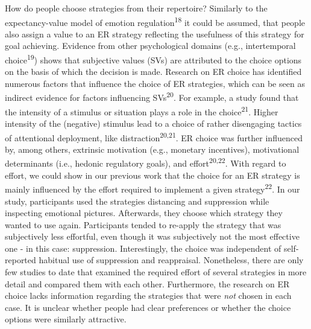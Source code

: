\documentclass[
  english,
  man,floatsintext]{apa6}
\begin{document}
How do people choose strategies from their repertoire?
Similarly to the expectancy-value model of emotion regulation\textsuperscript{18} it could be assumed, that people also assign a value to an ER strategy reflecting the usefulness of this strategy for goal achieving.
Evidence from other psychological domains (e.g., intertemporal choice\textsuperscript{19}) shows that subjective values (SVs) are attributed to the choice options on the basis of which the decision is made.
Research on ER choice has identified numerous factors that influence the choice of ER strategies, which can be seen as indirect evidence for factors influencing SVs\textsuperscript{20}.
For example, a study found that the intensity of a stimulus or situation plays a role in the choice\textsuperscript{21}.
Higher intensity of the (negative) stimulus lead to a choice of rather disengaging tactics of attentional deployment, like distraction\textsuperscript{20,21}.
ER choice was further influenced by, among others, extrinsic motivation (e.g., monetary incentives), motivational determinants (i.e., hedonic regulatory goals), and effort\textsuperscript{20,22}.
With regard to effort, we could show in our previous work that the choice for an ER strategy is mainly influenced by the effort required to implement a given strategy\textsuperscript{22}.
In our study, participants used the strategies distancing and suppression while inspecting emotional pictures.
Afterwards, they choose which strategy they wanted to use again.
Participants tended to re-apply the strategy that was subjectively less effortful, even though it was subjectively not the most effective one - in this case: suppression.
Interestingly, the choice was independent of self-reported habitual use of suppression and reappraisal.
Nonetheless, there are only few studies to date that examined the required effort of several strategies in more detail and compared them with each other.
Furthermore, the research on ER choice lacks information regarding the strategies that were \emph{not} chosen in each case.
It is unclear whether people had clear preferences or whether the choice options were similarly attractive.
\end{document}
